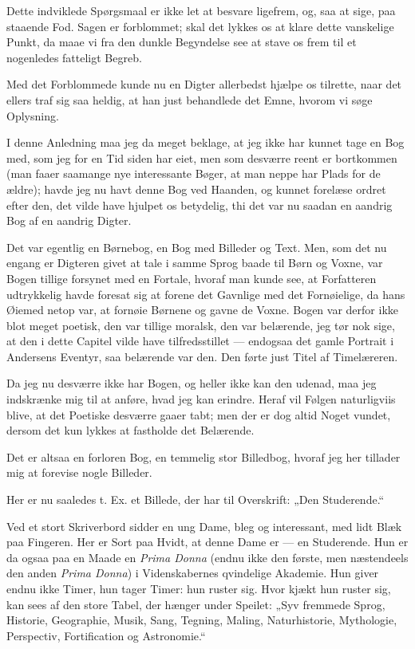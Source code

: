 \documentclass[12pt,a4paper]{book}
\newcommand{\apage}[1]{\marginnote{\footnotesize\textit{[#1]}}}
\begin{document}
Dette indviklede Spørgsmaal er ikke let at besvare ligefrem, og,
saa at sige, paa staaende Fod. Sagen er forblommet; skal det
lykkes os at klare dette vanskelige Punkt, da maae vi fra den
dunkle Begyndelse see at stave os frem til et nogenledes fatteligt
Begreb.

Med det Forblommede kunde nu en Digter allerbedst hjælpe os
tilrette, naar det ellers traf sig saa heldig, at han just behandlede
det Emne, hvorom vi søge Oplysning.

I denne Anledning maa jeg da meget beklage, at jeg ikke har kunnet
tage en Bog med, som jeg for en Tid siden har eiet, men som
desværre reent er bortkommen (man faaer saamange nye interessante
Bøger, at man neppe har Plads for de ældre); havde jeg nu havt
denne Bog ved Haanden, og kunnet forelæse ordret efter den, det
vilde have hjulpet os betydelig, thi det var nu saadan en aandrig
Bog af en aandrig Digter.

Det var egentlig en Børnebog, en Bog med Billeder og Text. Men, som
det nu engang er Digteren givet at tale i samme Sprog baade til
Børn og Voxne, var Bogen tillige forsynet med en Fortale, hvoraf
man kunde see, at Forfatteren udtrykkelig havde foresat sig at
forene det Gavnlige med det Fornøielige, da hans Øiemed netop var,
at fornøie Børnene og gavne de Voxne. Bogen var derfor ikke blot
meget poetisk, den var tillige moralsk, den var belærende, jeg tør
nok sige, at den i dette Capitel vilde have tilfredsstillet ---
endogsaa det gamle Portrait i Andersens Eventyr, saa belærende var
den. Den førte just Titel af Timelæreren.
 \apage{83}

Da jeg nu desværre ikke har Bogen, og heller ikke kan den udenad,
maa jeg indskrænke mig til at anføre, hvad jeg kan erindre. Heraf
vil Følgen naturligviis blive, at det Poetiske desværre gaaer tabt;
men der er dog altid Noget vundet, dersom det kun lykkes at
fastholde det Belærende.

Det er altsaa en forloren Bog, en temmelig stor Billedbog, hvoraf
jeg her tillader mig at forevise nogle Billeder.

Her er nu saaledes t. Ex. et Billede, der har til Overskrift: „Den
Studerende.“

Ved et stort Skriverbord sidder en ung Dame, bleg og interessant,
med lidt Blæk paa Fingeren. Her er Sort paa Hvidt, at denne Dame er
--- en Studerende. Hun er da ogsaa paa en Maade en \textit{Prima
Donna} (endnu ikke den første, men næstendeels den anden \textit{Prima
Donna}) i Videnskabernes qvindelige Akademie. Hun giver endnu ikke
Timer, hun tager Timer: hun ruster sig. Hvor kjækt hun ruster sig,
kan sees af den store Tabel, der hænger under Speilet: „Syv
fremmede Sprog, Historie, Geographie, Musik, Sang, Tegning, Maling,
Naturhistorie, Mythologie, Perspectiv, Fortification og
Astronomie.“
\end{document}

